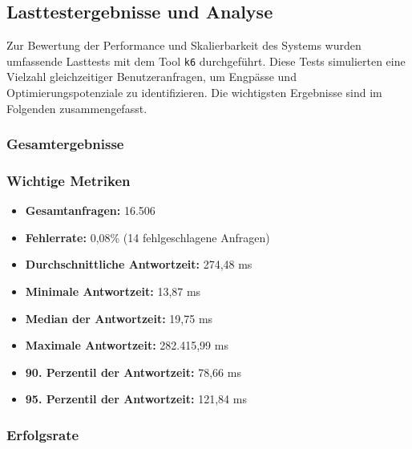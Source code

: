 \subsection{Lasttestergebnisse und Analyse}

Zur Bewertung der Performance und Skalierbarkeit des Systems wurden umfassende Lasttests mit dem 
Tool \texttt{k6} durchgeführt. Diese Tests simulierten eine Vielzahl gleichzeitiger 
Benutzeranfragen, um Engpässe und Optimierungspotenziale zu identifizieren. Die wichtigsten 
Ergebnisse sind im Folgenden zusammengefasst.

\subsubsection*{Gesamtergebnisse}

\subsubsection*{Wichtige Metriken}
\begin{itemize}
    \item \textbf{Gesamtanfragen:} 16.506
    \item \textbf{Fehlerrate:} 0,08\% (14 fehlgeschlagene Anfragen)
    \item \textbf{Durchschnittliche Antwortzeit:} 274,48 ms
    \item \textbf{Minimale Antwortzeit:} 13,87 ms
    \item \textbf{Median der Antwortzeit:} 19,75 ms
    \item \textbf{Maximale Antwortzeit:} 282.415,99 ms
    \item \textbf{90. Perzentil der Antwortzeit:} 78,66 ms
    \item \textbf{95. Perzentil der Antwortzeit:} 121,84 ms
\end{itemize}

\subsubsection*{Erfolgsrate}


